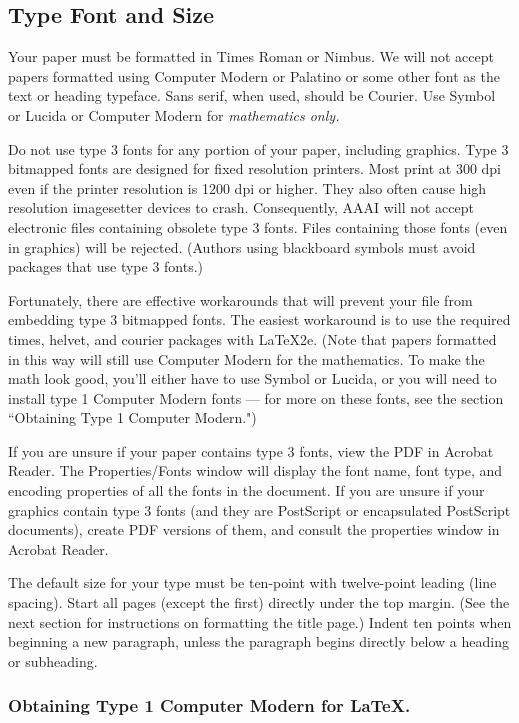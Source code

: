 \subsection{Type Font and Size}
Your paper must be formatted in Times Roman or Nimbus. We will not accept papers formatted using Computer Modern or Palatino or some other font as the text or heading typeface. Sans serif, when used, should be Courier. Use Symbol or Lucida or Computer Modern for \textit{mathematics only. }

Do not use type 3 fonts for any portion of your paper, including graphics. Type 3 bitmapped fonts are designed for fixed resolution printers. Most print at 300 dpi even if the printer resolution is 1200 dpi or higher. They also often cause high resolution imagesetter devices to crash. Consequently, AAAI will not accept electronic files containing obsolete type 3 fonts. Files containing those fonts (even in graphics) will be rejected. (Authors using blackboard symbols must avoid packages that use type 3 fonts.)

Fortunately, there are effective workarounds that will prevent your file from embedding type 3 bitmapped fonts. The easiest workaround is to use the required times, helvet, and courier packages with \LaTeX{}2e. (Note that papers formatted in this way will still use Computer Modern for the mathematics. To make the math look good, you'll either have to use Symbol or Lucida, or you will need to install type 1 Computer Modern fonts --- for more on these fonts, see the section ``Obtaining Type 1 Computer Modern.")

If you are unsure if your paper contains type 3 fonts, view the PDF in Acrobat Reader. The Properties/Fonts window will display the font name, font type, and encoding properties of all the fonts in the document. If you are unsure if your graphics contain type 3 fonts (and they are PostScript or encapsulated PostScript documents), create PDF versions of them, and consult the properties window in Acrobat Reader.

The default size for your type must be ten-point with twelve-point leading (line spacing). Start all pages (except the first) directly under the top margin. (See the next section for instructions on formatting the title page.) Indent ten points when beginning a new paragraph, unless the paragraph begins directly below a heading or subheading.


\subsubsection{Obtaining Type 1 Computer Modern for \LaTeX{}.}

